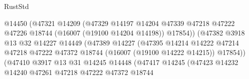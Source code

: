 \begin{lexlean}{RustStd}
\begin{coremodule}
                                            @14450
                                            (@47321
                                              @14209
                                              (@47329
                                                @14197
                                                @14204
                                                @47339
                                                @47218
                                                @47222
                                                @47226
                                                @18744
                                                (@16007 (@19100 @14204 @14198))
                                                @17854))
                                            (@47382
                                              @3918
                                              @13
                                              @32
                                              @14227
                                              @14449
                                              (@47389
                                                @14227
                                                (@47395
                                                  @14214
                                                  @14222
                                                  @47214
                                                  @47218
                                                  @47222
                                                  @47372
                                                  @18744
                                                  (@16007 (@19100 @14222 @14215))
                                                  @17854))
                                              (@47410
                                                @3917
                                                @13
                                                @31
                                                @14245
                                                @14448
                                                (@47417
                                                  @14245
                                                  (@47423
                                                    @14232
                                                    @14240
                                                    @47261
                                                    @47218
                                                    @47222
                                                    @47372
                                                    @18744

\end{coremodule}
\end{lexlean}
